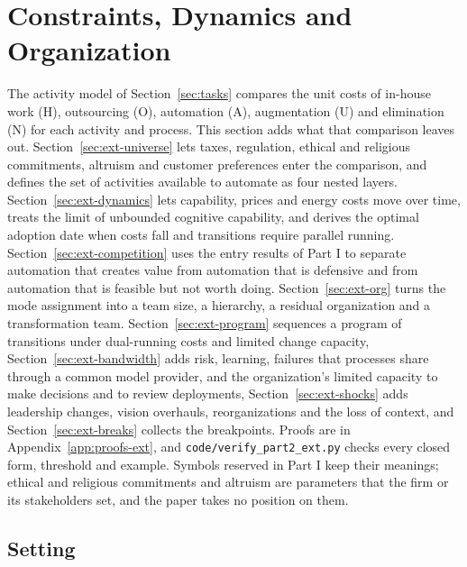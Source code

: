 \section{Constraints, Dynamics and Organization}\label{sec:ext}

The activity model of Section~\ref{sec:tasks} compares the unit costs of in-house work (H), outsourcing (O), automation (A), augmentation (U) and elimination (N) for each activity and process. This section adds what that comparison leaves out. Section~\ref{sec:ext-universe} lets taxes, regulation, ethical and religious commitments, altruism and customer preferences enter the comparison, and defines the set of activities available to automate as four nested layers. Section~\ref{sec:ext-dynamics} lets capability, prices and energy costs move over time, treats the limit of unbounded cognitive capability, and derives the optimal adoption date when costs fall and transitions require parallel running. Section~\ref{sec:ext-competition} uses the entry results of Part I to separate automation that creates value from automation that is defensive and from automation that is feasible but not worth doing. Section~\ref{sec:ext-org} turns the mode assignment into a team size, a hierarchy, a residual organization and a transformation team. Section~\ref{sec:ext-program} sequences a program of transitions under dual-running costs and limited change capacity, Section~\ref{sec:ext-bandwidth} adds risk, learning, failures that processes share through a common model provider, and the organization's limited capacity to make decisions and to review deployments, Section~\ref{sec:ext-shocks} adds leadership changes, vision overhauls, reorganizations and the loss of context, and Section~\ref{sec:ext-breaks} collects the breakpoints. Proofs are in Appendix~\ref{app:proofs-ext}, and \texttt{code/verify\_part2\_ext.py} checks every closed form, threshold and example. Symbols reserved in Part I keep their meanings; ethical and religious commitments and altruism are parameters that the firm or its stakeholders set, and the paper takes no position on them.

\subsection{Setting}\label{sec:ext-setup}

